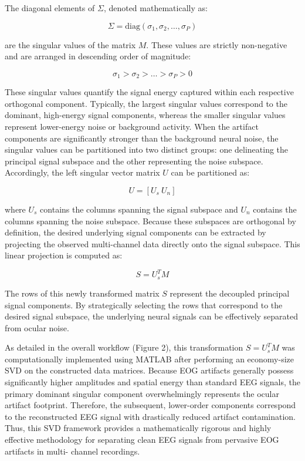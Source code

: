 \documentclass[17pt,a4paper]{extarticle}
\begin{document}
The diagonal elements of $\Sigma$, denoted mathematically as:

\[
\Sigma = \text{diag}(\sigma_1, \sigma_2, \dots, \sigma_P)
\]

are the singular values of the matrix $M$. These values are strictly non-negative and
are arranged in descending order of magnitude:

\[
\sigma_1 > \sigma_2 > \dots > \sigma_P > 0
\]

These singular values quantify the signal energy captured within each respective
orthogonal component. Typically, the largest singular values correspond to the
dominant, high-energy signal components, whereas the smaller singular values
represent lower-energy noise or background activity. When the artifact components
are significantly stronger than the background neural noise, the singular values can
be partitioned into two distinct groups: one delineating the principal signal subspace
and the other representing the noise subspace. Accordingly, the left singular vector
matrix $U$ can be partitioned as:

\[
U = [U_s\ U_n]
\]

where $U_s$ contains the columns spanning the signal subspace and $U_n$ contains the
columns spanning the noise subspace. Because these subspaces are orthogonal by
definition, the desired underlying signal components can be extracted by projecting
the observed multi-channel data directly onto the signal subspace. This linear
projection is computed as:

\[
S = U_s^T M
\]

The rows of this newly transformed matrix $S$ represent the decoupled principal
signal components. By strategically selecting the rows that correspond to the
desired signal subspace, the underlying neural signals can be effectively separated
from ocular noise.

As detailed in the overall workflow (Figure 2), this transformation $S = U_s^T M$ was
computationally implemented using MATLAB after performing an economy-size SVD
on the constructed data matrices. Because EOG artifacts generally possess
significantly higher amplitudes and spatial energy than standard EEG signals, the
primary dominant singular component overwhelmingly represents the ocular artifact
footprint. Therefore, the subsequent, lower-order components correspond to the
reconstructed EEG signal with drastically reduced artifact contamination. Thus, this
SVD framework provides a mathematically rigorous and highly effective
methodology for separating clean EEG signals from pervasive EOG artifacts in multi-
channel recordings.
\end{document}
